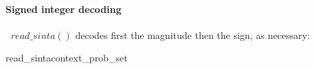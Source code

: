 \paragraph{Signed integer decoding}
$\ $\newline
$read\_sinta()$ decodes first the magnitude then the sign, as necessary:

\begin{pseudo}{read\_sinta}{context\_prob\_set}
  \bsEND
\bsEND
{}
\end{pseudo}
